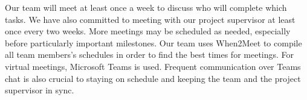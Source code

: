 \documentclass{article}
\begin{document}
\noindent Our team will meet at least once a week to discuss who will complete which tasks. We have also committed to meeting with our project supervisor at least once every two weeks. More meetings may be scheduled as needed, especially before particularly important milestones. Our team uses When2Meet to compile all team members's schedules in order to find the best times for meetings. For virtual meetings, Microsoft Teams is used. Frequent communication over Teams chat is also crucial to staying on schedule and keeping the team and the project supervisor in sync. \\
\end{document}
